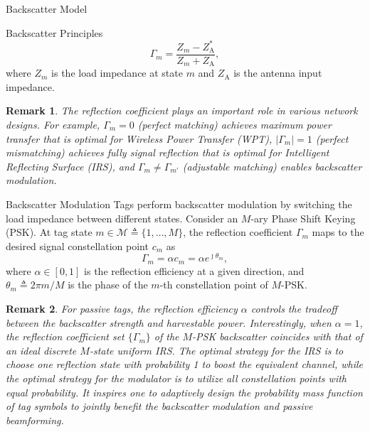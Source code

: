 \documentclass[journal]{IEEEtran}
\newtheorem{remark}{Remark}
\begin{document}
\begin{section}{Backscatter Model}
\begin{subsection}{Backscatter Principles}
			\begin{equation}
				\Gamma_m = \frac{Z_m - Z_{\mathrm{A}}^*}{Z_m + Z_{\mathrm{A}}},
				\label{eq:reflection_coefficient}
			\end{equation}
			where $Z_m$ is the load impedance at state $m$ and $Z_{\mathrm{A}}$ is the antenna input impedance.
			\begin{remark}
				The reflection coefficient plays an important role in various network designs. For example, $\Gamma_m = 0$ (perfect matching) achieves maximum power transfer that is optimal for Wireless Power Transfer (WPT), $\lvert \Gamma_m \rvert = 1$ (perfect mismatching) achieves fully signal reflection that is optimal for Intelligent Reflecting Surface (IRS), and $\Gamma_m \ne \Gamma_{m'}$ (adjustable matching) enables backscatter modulation.
			\end{remark}
		\end{subsection}

		\begin{subsection}{Backscatter Modulation}
			Tags perform backscatter modulation by switching the load impedance between different states. Consider an $M$-ary Phase Shift Keying (PSK). At tag state $m \in \mathcal{M} \triangleq \{1,\ldots,M\}$, the reflection coefficient $\Gamma_m$ maps to the desired signal constellation point $c_m$ as \cite{Thomas2012a}
			\begin{equation}
				\Gamma_m = \alpha c_m = \alpha e^{\jmath \theta_m},
				\label{eq:backscatter_modulation}
			\end{equation}
			where $\alpha \in [0,1]$ is the reflection efficiency at a given direction, and $\theta_m \triangleq 2 \pi m / M$ is the phase of the $m$-th constellation point of $M$-PSK.
			\begin{remark}
				For passive tags, the reflection efficiency $\alpha$ controls the tradeoff between the backscatter strength and harvestable power. Interestingly, when $\alpha = 1$, the reflection coefficient set $\{\Gamma_m\}$ of the $M$-PSK backscatter coincides with that of an ideal discrete $M$-state uniform IRS. The optimal strategy for the IRS is to choose one reflection state with probability \num{1} to boost the equivalent channel, while the optimal strategy for the modulator is to utilize all constellation points with equal probability. It inspires one to adaptively design the probability mass function of tag symbols to jointly benefit the backscatter modulation and passive beamforming.
			\end{remark}
		\end{subsection}
	\end{section}
\end{document}
